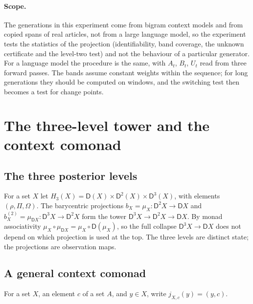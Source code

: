 \documentclass[11pt]{article}
\theoremstyle{definition}
\theoremstyle{remark}
\newcommand{\D}{\mathsf{D}}
\begin{document}
\paragraph{Scope.} The generations in this experiment come from bigram context models and from
copied spans of real articles, not from a large language model, so the experiment tests the
statistics of the projection (identifiability, band coverage, the unknown certificate and the
level-two test) and not the behaviour of a particular generator. For a language model the
procedure is the same, with $A_t$, $B_t$, $U_t$ read from three forward passes. The bands assume
constant weights within the sequence; for long generations they should be computed on windows, and
the switching test then becomes a test for change points.


\section{The three-level tower and the context comonad}

\subsection{The three posterior levels}

For a set $X$ let $H_3(X)=\D(X)\times\D^2(X)\times\D^3(X)$, with elements $(\rho,\Pi,\Omega)$. The
barycentric projections $b_X=\mu_X\colon\D^2X\to\D X$ and $b^{(2)}_X=\mu_{\D X}\colon\D^3X\to\D^2X$
form the tower $\D^3X\to\D^2X\to\D X$. By monad associativity
$\mu_X\circ\mu_{\D X}=\mu_X\circ\D(\mu_X)$, so the full collapse $\D^3X\to\D X$ does not depend on
which projection is used at the top. The three levels are distinct state; the projections are
observation maps.

\subsection{A general context comonad}

For a set $X$, an element $c$ of a set $A$, and $y\in X$, write $j_{X,c}(y)=(y,c)$.
\end{document}
